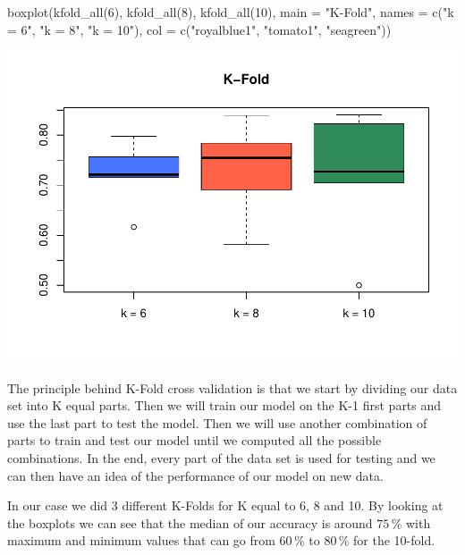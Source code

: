 \documentclass[
]{article}
\newenvironment{Shaded}{\begin{snugshade}}{\end{snugshade}}
\newcommand{\AttributeTok}[1]{\textcolor[rgb]{0.77,0.63,0.00}{#1}}
\newcommand{\DecValTok}[1]{\textcolor[rgb]{0.00,0.00,0.81}{#1}}
\newcommand{\FunctionTok}[1]{\textcolor[rgb]{0.00,0.00,0.00}{#1}}
\newcommand{\NormalTok}[1]{#1}
\newcommand{\StringTok}[1]{\textcolor[rgb]{0.31,0.60,0.02}{#1}}
\begin{document}
\begin{Shaded}
\begin{Highlighting}[]
\FunctionTok{boxplot}\NormalTok{(}\FunctionTok{kfold\_all}\NormalTok{(}\DecValTok{6}\NormalTok{), }\FunctionTok{kfold\_all}\NormalTok{(}\DecValTok{8}\NormalTok{), }\FunctionTok{kfold\_all}\NormalTok{(}\DecValTok{10}\NormalTok{), }
        \AttributeTok{main =} \StringTok{"K{-}Fold"}\NormalTok{, }\AttributeTok{names =} \FunctionTok{c}\NormalTok{(}\StringTok{"k = 6"}\NormalTok{, }\StringTok{"k = 8"}\NormalTok{, }\StringTok{"k = 10"}\NormalTok{), }
        \AttributeTok{col =} \FunctionTok{c}\NormalTok{(}\StringTok{"royalblue1"}\NormalTok{, }\StringTok{"tomato1"}\NormalTok{, }\StringTok{"seagreen"}\NormalTok{))}
\end{Highlighting}
\end{Shaded}

\begin{center}\includegraphics{TP3_MERR_HABBOU_KHIDOUR_files/figure-latex/unnamed-chunk-24-1} \end{center}

The principle behind K-Fold cross validation is that we start by
dividing our data set into K equal parts. Then we will train our model
on the K-1 first parts and use the last part to test the model. Then we
will use another combination of parts to train and test our model until
we computed all the possible combinations. In the end, every part of the
data set is used for testing and we can then have an idea of the
performance of our model on new data.

In our case we did 3 different K-Folds for K equal to 6, 8 and 10. By
looking at the boxplots we can see that the median of our accuracy is
around \(75\,\%\) with maximum and minimum values that can go from
\(60\,\%\) to \(80\,\%\) for the 10-fold.
\end{document}
